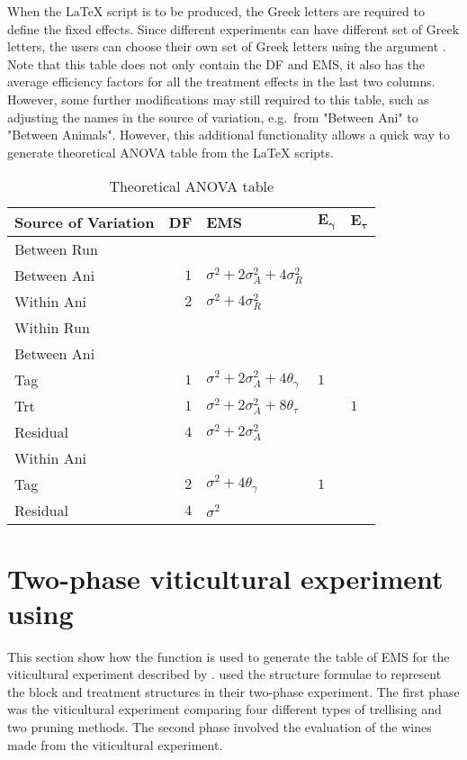 \documentclass[article]{jss}
\begin{document}
When the {\LaTeX} script is to be produced, the Greek letters are required to define the fixed effects. Since different experiments can have different set of Greek letters, the users can choose their own set of Greek letters using the argument . Note that this table does not only contain the DF and EMS, it also has the average efficiency factors for all the treatment effects in the last two columns. However, some further modifications may still required to this table, such as adjusting the names in the source of variation, e.g.\ from "Between Ani" to "Between Animals". However, this additional functionality allows a quick way to generate theoretical ANOVA table from the {\LaTeX} scripts.  

\begin{table}[ht]
\centering
 \caption{Theoretical ANOVA table}
 \begin{tabular}[t]{lrlll} 
 \toprule 
 \multicolumn{1}{l}{\textbf{Source of Variation}} & \multicolumn{1}{l}{\textbf{DF}} & \multicolumn{1}{l}{\textbf{EMS}}& \multicolumn{1}{l}{$\bm{E_{\gamma}}$}&\multicolumn{1}{l}{$\bm{E_{\tau}}$}\\ 
 \midrule 
 Between Run &  &  & & \\ 
 \quad Between Ani & $1$ & $\sigma^2+2\sigma_{A}^2+4\sigma_{R}^2$ & & \\ \hline 
 \quad Within Ani & $2$ & $\sigma^2+4\sigma_{R}^2$ & & \\ \hline 
 Within Run &  &  & & \\ 
 \quad Between Ani &  &  & & \\ 
 \quad \quad Tag & $1$ & $\sigma^2+2\sigma_{A}^2+4\theta_{\gamma}$ &$1$ & \\ 
 \quad \quad Trt & $1$ & $\sigma^2+2\sigma_{A}^2+8\theta_{\tau}$ & & $1$\\ 
 \quad \quad Residual & $4$ & $\sigma^2+2\sigma_{A}^2$ & & \\ \hline 
 \quad Within Ani &  &  & & \\ 
 \quad \quad Tag & $2$ & $\sigma^2+4\theta_{\gamma}$ &$1$ & \\ 
 \quad \quad Residual & $4$ & $\sigma^2$ & & \\ 
 \bottomrule 
 \end{tabular} 
  \label{tab:ouputFromR} 
\end{table} 

\section[Example]{Two-phase viticultural experiment using }\label{sec:example}
This section show how the function  is used to generate the table of EMS for the viticultural experiment described by \cite{Brien1999}. \citeauthor{Brien1999} used the structure formulae to represent the block and treatment structures in their two-phase experiment. The first phase was the viticultural experiment comparing four different types of trellising and two pruning methods. The second phase involved the evaluation of the wines made from the viticultural experiment.
\end{document}
